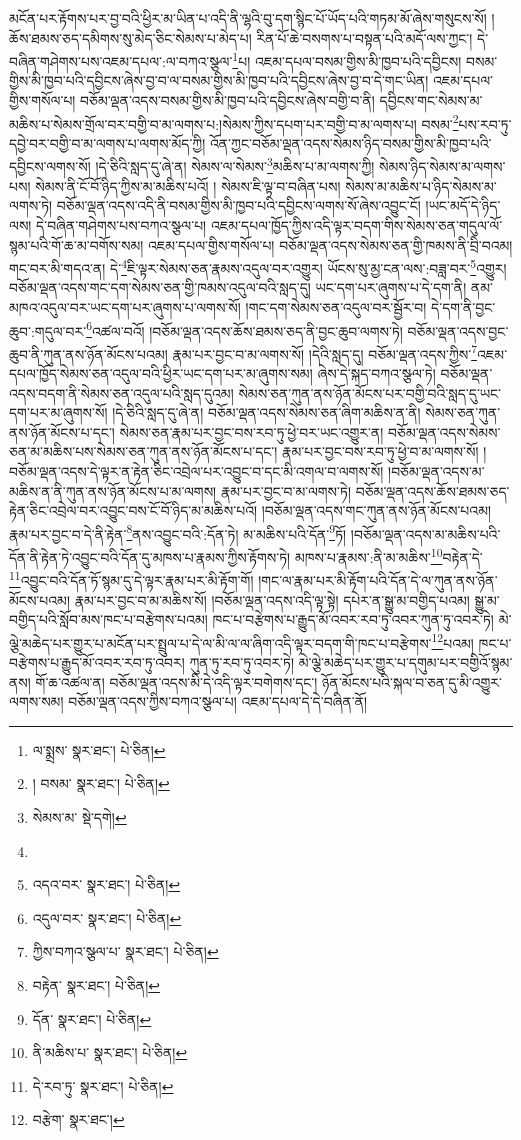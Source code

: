 མངོན་པར་རྟོགས་པར་བྱ་བའི་ཕྱིར་མ་ཡིན་པ་འདི་ནི་ལྷའི་བུ་དག་སྙིང་པོ་ཡོད་པའི་གཏམ་མོ་ཞེས་གསུངས་སོ། །ཆོས་ཐམས་ཅད་དམིགས་སུ་མེད་ཅིང་སེམས་པ་མེད་པ། རིན་པོ་ཆེ་བསགས་པ་བསྟན་པའི་མདོ་ལས་ཀྱང་། དེ་བཞིན་གཤེགས་པས་འཇམ་དཔལ་:ལ་བཀའ་སྩལ་\footnote{ལ་སྨྲས་  སྣར་ཐང་།  པེ་ཅིན། }པ། འཇམ་དཔལ་བསམ་གྱིས་མི་ཁྱབ་པའི་དབྱིངས། བསམ་གྱིས་མི་ཁྱབ་པའི་དབྱིངས་ཞེས་བྱ་བ་ལ་བསམ་གྱིས་མི་ཁྱབ་པའི་དབྱིངས་ཞེས་བྱ་བ་དེ་གང་ཡིན། འཇམ་དཔལ་གྱིས་གསོལ་པ། བཅོམ་ལྡན་འདས་བསམ་གྱིས་མི་ཁྱབ་པའི་དབྱིངས་ཞེས་བགྱི་བ་ནི། དབྱིངས་གང་སེམས་མ་མཆིས་པ་སེམས་གྲོལ་བར་བགྱི་བ་མ་ལགས་པ:།སེམས་ཀྱིས་དཔག་པར་བགྱི་བ་མ་ལགས་པ། བསམ་\footnote{། བསམ་  སྣར་ཐང་།  པེ་ཅིན། }པས་རབ་ཏུ་དབྱེ་བར་བགྱི་བ་མ་ལགས་པ་ལགས་མོད་ཀྱི། འོན་ཀྱང་བཅོམ་ལྡན་འདས་སེམས་ཉིད་བསམ་གྱིས་མི་ཁྱབ་པའི་དབྱིངས་ལགས་སོ། །དེ་ཅིའི་སླད་དུ་ཞེ་ན། སེམས་ལ་སེམས་\footnote{སེམས་མ་  སྡེ་དགེ། }མཆིས་པ་མ་ལགས་ཀྱི། སེམས་ཉིད་སེམས་མ་ལགས་པས། སེམས་ནི་ངོ་བོ་ཉིད་ཀྱིས་མ་མཆིས་པའོ། །
སེམས་ཇི་ལྟ་བ་བཞིན་པས། སེམས་མ་མཆིས་པ་ཉིད་སེམས་མ་ལགས་ཏེ། བཅོམ་ལྡན་འདས་འདི་ནི་བསམ་གྱིས་མི་ཁྱབ་པའི་དབྱིངས་ལགས་སོ་ཞེས་འབྱུང་ངོ། །ཡང་མདོ་དེ་ཉིད་ལས། དེ་བཞིན་གཤེགས་པས་བཀའ་སྩལ་པ། འཇམ་དཔལ་ཁྱོད་ཀྱིས་འདི་ལྟར་བདག་གིས་སེམས་ཅན་གདུལ་ལོ་སྙམ་པའི་གོ་ཆ་མ་བགོས་སམ། འཇམ་དཔལ་གྱིས་གསོལ་པ། བཅོམ་ལྡན་འདས་སེམས་ཅན་གྱི་ཁམས་ནི་བྲི་བའམ། གང་བར་མི་གདའ་ན། དེ་\footnote{}ཇི་ལྟར་སེམས་ཅན་རྣམས་འདུལ་བར་འགྱུར། ཡོངས་སུ་མྱ་ངན་ལས་:བཟླ་བར་\footnote{འདའ་བར་  སྣར་ཐང་།  པེ་ཅིན། }འགྱུར། བཅོམ་ལྡན་འདས་གང་དག་སེམས་ཅན་གྱི་ཁམས་འདུལ་བའི་སླད་དུ། ཡང་དག་པར་ཞུགས་པ་དེ་དག་ནི། ནམ་མཁའ་འདུལ་བར་ཡང་དག་པར་ཞུགས་པ་ལགས་སོ། །གང་དག་སེམས་ཅན་འདུལ་བར་སྦྱོར་བ། དེ་དག་ནི་བྱང་ཆུབ་:གདུལ་བར་\footnote{འདུལ་བར་  སྣར་ཐང་།  པེ་ཅིན། }འཚལ་བའོ། །བཅོམ་ལྡན་འདས་ཆོས་ཐམས་ཅད་ནི་བྱང་ཆུབ་ལགས་ཏེ། བཅོམ་ལྡན་འདས་བྱང་ཆུབ་ནི་ཀུན་ནས་ཉོན་མོངས་པའམ། རྣམ་པར་བྱང་བ་མ་ལགས་སོ། །དེའི་སླད་དུ། བཅོམ་ལྡན་འདས་ཀྱིས་\footnote{ཀྱིས་བཀའ་སྩལ་པ་  སྣར་ཐང་།  པེ་ཅིན། }འཇམ་དཔལ་ཁྱོད་སེམས་ཅན་འདུལ་བའི་ཕྱིར་ཡང་དག་པར་མ་ཞུགས་སམ། ཞེས་དེ་སྐད་བཀའ་སྩལ་ཏེ། བཅོམ་ལྡན་འདས་བདག་ནི་སེམས་ཅན་འདུལ་པའི་སླད་དུའམ། སེམས་ཅན་ཀུན་ནས་ཉོན་མོངས་པར་བགྱི་བའི་སླད་དུ་ཡང་དག་པར་མ་ཞུགས་སོ། །དེ་ཅིའི་སླད་དུ་ཞེ་ན། བཅོམ་ལྡན་འདས་སེམས་ཅན་ཞིག་མཆིས་ན་ནི། སེམས་ཅན་ཀུན་ནས་ཉོན་མོངས་པ་དང་། སེམས་ཅན་རྣམ་པར་བྱང་བས་རབ་ཏུ་ཕྱེ་བར་ཡང་འགྱུར་ན། བཅོམ་ལྡན་འདས་སེམས་ཅན་མ་མཆིས་པས་སེམས་ཅན་ཀུན་ནས་ཉོན་མོངས་པ་དང་། རྣམ་པར་བྱང་བས་རབ་ཏུ་ཕྱེ་བ་མ་ལགས་སོ། །བཅོམ་ལྡན་འདས་དེ་ལྟར་ན་རྟེན་ཅིང་འབྲེལ་པར་འབྱུང་བ་དང་མི་འགལ་བ་ལགས་སོ། །བཅོམ་ལྡན་འདས་མ་མཆིས་ན་ནི་ཀུན་ནས་ཉོན་མོངས་པ་མ་ལགས། རྣམ་པར་བྱང་བ་མ་ལགས་ཏེ། བཅོམ་ལྡན་འདས་ཆོས་ཐམས་ཅད་རྟེན་ཅིང་འབྲེལ་བར་འབྱུང་བས་ངོ་བོ་ཉིད་མ་མཆིས་པའོ། །བཅོམ་ལྡན་འདས་གང་ཀུན་ནས་ཉོན་མོངས་པའམ། རྣམ་པར་བྱང་བ་དེ་ནི་རྟེན་\footnote{བརྟེན་  སྣར་ཐང་།  པེ་ཅིན། }ནས་འབྱུང་བའི་:དོན་ཏེ། མ་མཆིས་པའི་དོན་\footnote{དོན་  སྣར་ཐང་།  པེ་ཅིན། }ཏོ། །བཅོམ་ལྡན་འདས་མ་མཆིས་པའི་དོན་ནི་རྟེན་ཏེ་འབྱུང་བའི་དོན་དུ་མཁས་པ་རྣམས་ཀྱིས་རྟོགས་ཏེ། མཁས་པ་རྣམས་:ནི་མ་མཆིས་\footnote{ནི་མཆིས་པ་  སྣར་ཐང་།  པེ་ཅིན། }བརྟེན་དེ་\footnote{དེ་རབ་ཏུ་  སྣར་ཐང་།  པེ་ཅིན། }འབྱུང་བའི་དོན་ཏོ་སྙམ་དུ་དེ་ལྟར་རྣམ་པར་མི་རྟོག་གོ། །གང་ལ་རྣམ་པར་མི་རྟོག་པའི་དོན་དེ་ལ་ཀུན་ནས་ཉོན་མོངས་པའམ། རྣམ་པར་བྱང་བ་མ་མཆིས་སོ། །བཅོམ་ལྡན་འདས་འདི་ལྟ་སྟེ། དཔེར་ན་སྒྱུ་མ་བགྱིད་པའམ། སྒྱུ་མ་བགྱིད་པའི་སློབ་མས་ཁང་པ་བརྩེགས་པའམ། ཁང་པ་བརྩེགས་པ་རྒྱུད་མོ་འབར་རབ་ཏུ་འབར་ཀུན་ཏུ་འབར་ཏེ། མེ་ལྕེ་མཆེད་པར་གྱུར་པ་མངོན་པར་སྤྲུལ་པ་དེ་ལ་མི་ལ་ལ་ཞིག་འདི་ལྟར་བདག་གི་ཁང་པ་བརྩེགས་\footnote{བརྩེག་  སྣར་ཐང་། }པའམ། ཁང་པ་བརྩེགས་པ་རྒྱུད་མོ་འབར་རབ་ཏུ་འབར། ཀུན་ཏུ་རབ་ཏུ་འབར་ཏེ། མེ་ལྕེ་མཆེད་པར་གྱུར་པ་དགུམ་པར་བགྱིའོ་སྙམ་ནས། གོ་ཆ་འཚལ་ན། བཅོམ་ལྡན་འདས་མི་དེ་འདི་ལྟར་བགེགས་དང་། ཉོན་མོངས་པའི་སྐལ་བ་ཅན་དུ་མི་འགྱུར་ལགས་སམ། བཅོམ་ལྡན་འདས་ཀྱིས་བཀའ་སྩལ་པ། འཇམ་དཔལ་དེ་དེ་བཞིན་ནོ། 
